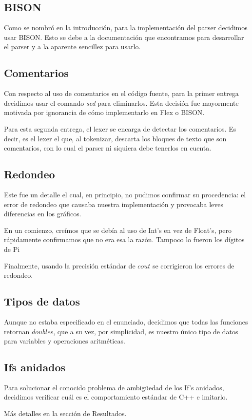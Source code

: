 \subsection{BISON}
Como se nombró en la introducción, para la implementación del parser decidimos usar BISON. Esto se debe a la documentación que encontramos para desarrollar el parser y a la aparente sencillez para usarlo.

\subsection{Comentarios}
Con respecto al uso de comentarios en el código fuente, para la primer entrega decidimos usar el comando \textit{sed} para eliminarlos. Esta decisión fue mayormente motivada por ignorancia de cómo implementarlo en Flex o BISON. 

Para esta segunda entrega, el lexer se encarga de detectar los comentarios. Es decir, es el lexer el que, al tokenizar, descarta los bloques de texto que son comentarios, con lo cual el parser ni siquiera debe tenerlos en cuenta.

\subsection{Redondeo}
Este fue un detalle el cual, en principio, no pudimos confirmar su procedencia: el error de redondeo que causaba nuestra implementación y provocaba leves diferencias en los gráficos.

En un comienzo, creímos que se debía al uso de Int's en vez de Float's, pero rápidamente confirmamos que no era esa la razón. Tampoco lo fueron los dígitos de Pi

Finalmente, usando la precisión estándar de $cout$ se corrigieron los errores de redondeo.

\subsection{Tipos de datos}
Aunque no estaba especificado en el enunciado, decidimos que todas las funciones retornan $double$s, que a su vez, por simplicidad, es nuestro único tipo de datos para variables y operaciones aritméticas.

\subsection{Ifs anidados}
Para solucionar el conocido problema de ambigüedad de los If's anidados, decidimos verificar cuál es el comportamiento estándar de C++ e imitarlo.

Más detalles en la sección de Resultados.